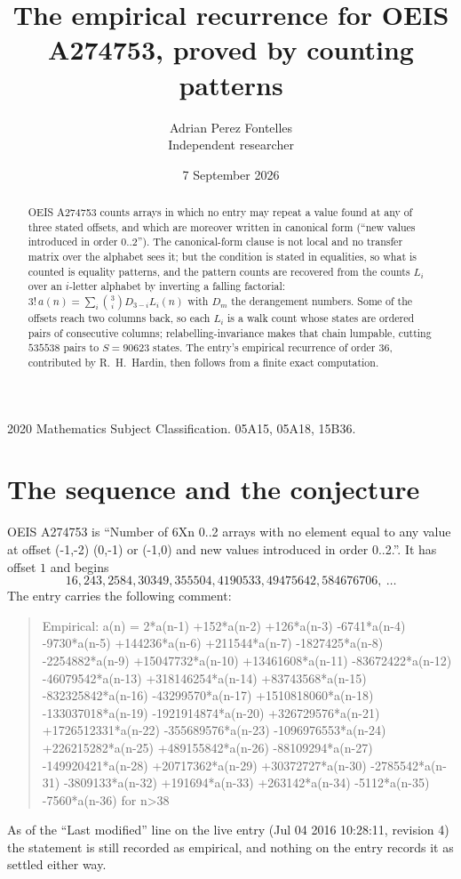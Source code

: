 \documentclass[11pt,a4paper]{article}
\title{The empirical recurrence for OEIS A274753, proved by counting patterns}
\author{Adrian Perez Fontelles\\ \small Independent researcher}
\date{7 September 2026}
\theoremstyle{plain}
\theoremstyle{definition}
\begin{document}
\maketitle

\begin{abstract}
OEIS A274753 counts arrays in which no entry may repeat a value found at any of three stated
offsets, and which are moreover written in canonical form (``new values introduced in order
$0..2$''). The canonical-form clause is not local and no transfer matrix over the
alphabet sees it; but the condition is stated in equalities, so what is counted is equality
patterns, and the pattern counts are recovered from the counts $L_i$ over an $i$-letter
alphabet by inverting a falling factorial:
$3!\,a(n)=\sum_i\binom{3}{i}D_{3-i}L_i(n)$ with $D_m$ the derangement numbers.
Some of the offsets reach two columns back, so each $L_i$ is a walk count whose states are
ordered pairs of consecutive columns; relabelling-invariance makes that chain lumpable,
cutting $535538$ pairs to $S=90623$ states. The entry's empirical recurrence of order $36$,
contributed by R.~H.~Hardin, then follows from a finite exact computation.
\end{abstract}

\noindent\small 2020 Mathematics Subject Classification. 05A15, 05A18, 15B36.\normalsize

\section{The sequence and the conjecture}

OEIS A274753 is ``Number of 6Xn 0..2 arrays with no element equal to any value at offset (-1,-2) (0,-1) or (-1,0) and new values introduced in order 0..2.''. It has offset $1$ and begins
\[
16, 243, 2584, 30349, 355504, 4190533, 49475642, 584676706,\ \dots
\]
The entry carries the following comment:
\begin{quote}\small
Empirical: a(n) = 2*a(n-1) +152*a(n-2) +126*a(n-3) -6741*a(n-4) -9730*a(n-5) +144236*a(n-6) +211544*a(n-7) -1827425*a(n-8) -2254882*a(n-9) +15047732*a(n-10) +13461608*a(n-11) -83672422*a(n-12) -46079542*a(n-13) +318146254*a(n-14) +83743568*a(n-15) -832325842*a(n-16) -43299570*a(n-17) +1510818060*a(n-18) -133037018*a(n-19) -1921914874*a(n-20) +326729576*a(n-21) +1726512331*a(n-22) -355689576*a(n-23) -1096976553*a(n-24) +226215282*a(n-25) +489155842*a(n-26) -88109294*a(n-27) -149920421*a(n-28) +20717362*a(n-29) +30372727*a(n-30) -2785542*a(n-31) -3809133*a(n-32) +191694*a(n-33) +263142*a(n-34) -5112*a(n-35) -7560*a(n-36) for n>38
\end{quote}
As of the ``Last modified'' line on the live entry (Jul 04 2016 10:28:11, revision 4) the statement is
still recorded as empirical, and nothing on the entry records it as settled either way.
\end{document}
